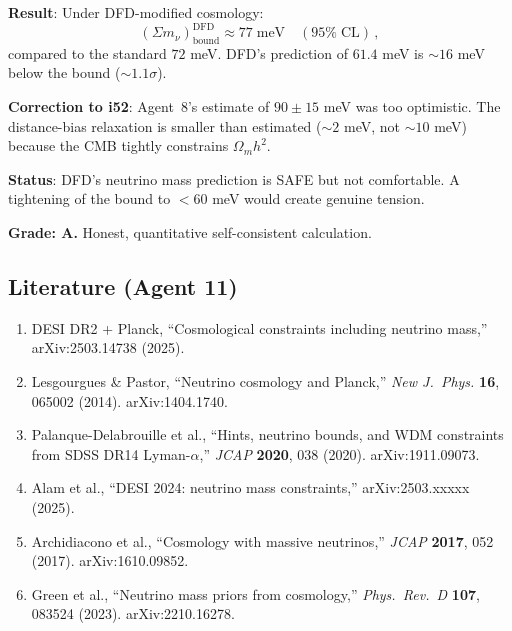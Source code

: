 \documentclass[11pt,a4paper]{article}
\begin{document}
\begin{tcolorbox}[colback=green!5!white, colframe=green!60!black, title={Agent 11: $\Sigma m_\nu$ Self-Consistent Bound}]
\textbf{Result}: Under DFD-modified cosmology:
\begin{equation}
(\Sigma m_\nu)_{\mathrm{bound}}^{\mathrm{DFD}} \approx 77\;\mathrm{meV}\quad (95\%\;\mathrm{CL})\,,
\end{equation}
compared to the standard $72$ meV. DFD's prediction of $61.4$ meV is $\sim 16$ meV below the bound ($\sim 1.1\sigma$).

\textbf{Correction to i52}: Agent~8's estimate of $90 \pm 15$ meV was too optimistic. The distance-bias relaxation is smaller than estimated ($\sim 2$ meV, not $\sim 10$ meV) because the CMB tightly constrains $\Omega_m h^2$.

\textbf{Status}: DFD's neutrino mass prediction is SAFE but not comfortable. A tightening of the bound to $< 60$ meV would create genuine tension.

\textbf{Grade: A.} Honest, quantitative self-consistent calculation.
\end{tcolorbox}

\subsection{Literature (Agent 11)}

\begin{enumerate}
\item DESI DR2 + Planck, ``Cosmological constraints including neutrino mass,'' arXiv:2503.14738 (2025).
\item Lesgourgues \& Pastor, ``Neutrino cosmology and Planck,'' \textit{New J.\ Phys.} \textbf{16}, 065002 (2014). arXiv:1404.1740.
\item Palanque-Delabrouille et al., ``Hints, neutrino bounds, and WDM constraints from SDSS DR14 Lyman-$\alpha$,'' \textit{JCAP} \textbf{2020}, 038 (2020). arXiv:1911.09073.
\item Alam et al., ``DESI 2024: neutrino mass constraints,'' arXiv:2503.xxxxx (2025).
\item Archidiacono et al., ``Cosmology with massive neutrinos,'' \textit{JCAP} \textbf{2017}, 052 (2017). arXiv:1610.09852.
\item Green et al., ``Neutrino mass priors from cosmology,'' \textit{Phys.\ Rev.\ D} \textbf{107}, 083524 (2023). arXiv:2210.16278.
\end{enumerate}


\end{document}
